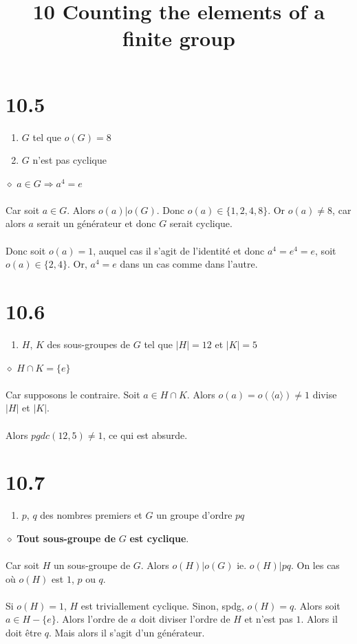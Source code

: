 \documentclass[a4paper,10pt]{article}
\title{10 Counting the elements of a finite group}
\begin{document}
\maketitle

\section*{10.5}
\begin{enumerate}
  \item $G$ tel que $o(G) = 8$ 
  \item $G$ n'est pas cyclique
\end{enumerate}
$\diamond$ $a \in G \Rightarrow a^4 = e$
\\
\\
Car soit $a \in G$. Alors $o(a) | o(G)$. Donc $o(a) \in \{1,2,4,8\}$. 
Or $o(a) \not = 8$, car alors $a$ serait un générateur et donc $G$ serait cyclique.
\\
\\
Donc soit $o(a) = 1$, auquel cas il s'agit de l'identité et donc $a^4 = e^4 = e$, soit
$o(a) \in \{2,4\}$. Or, $a^4 = e$ dans un cas comme dans l'autre. 

\section*{10.6}
\begin{enumerate}
 \item $H$, $K$ des sous-groupes de $G$ tel que $|H| = 12$ et $|K| = 5$
\end{enumerate}
$\diamond$ $H \cap K = \{e\}$
\\
\\
Car supposons le contraire. Soit $a \in H \cap K$. Alors $o(a) = o(\langle a \rangle) \not = 1$ divise $|H|$ et $|K|$.
\\
\\
Alors $pgdc(12,5) \not = 1$, ce qui est absurde.

\section*{10.7}
\begin{enumerate}
 \item $p$, $q$ des nombres premiers et $G$ un groupe d'ordre $pq$
\end{enumerate}
$\diamond$ \textbf{Tout sous-groupe de } $G$ \textbf{ est cyclique}.
\\
\\
Car soit $H$ un sous-groupe de $G$. Alors $o(H) | o(G)$ ie. $o(H) | pq$. On les cas où 
$o(H)$ est $1$, $p$ ou $q$. 
\\
\\
Si $o(H) = 1$, $H$ est triviallement cyclique. Sinon, spdg, $o(H) = q$. Alors soit $a \in H-\{e\}$. 
Alors l'ordre de $a$ doit diviser l'ordre de $H$ et n'est pas $1$. Alors il doit être $q$. Mais alors 
il s'agit d'un générateur. 
\end{document}
